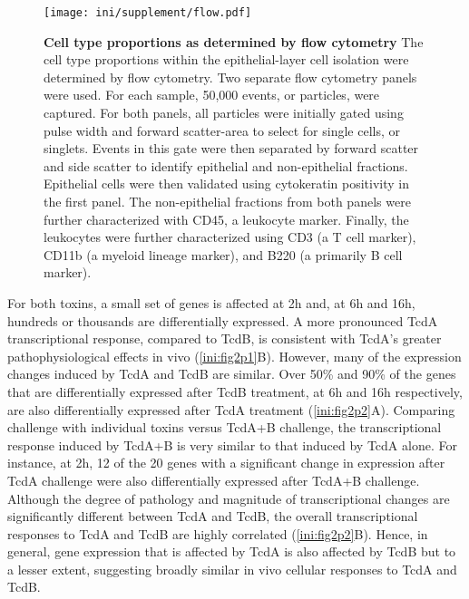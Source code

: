 \begin{figure}[t]
  \centering
    \texttt{[image: ini/supplement/flow.pdf]}
  \caption[Cell type proportions as determined by flow cytometry]
  {\textbf{Cell type proportions as determined by flow cytometry}
  The cell type proportions within the epithelial-layer cell isolation
were determined by flow cytometry. Two
separate flow cytometry panels were used. For each sample, 50,000
events, or particles, were captured. 
For both panels, all particles were initially gated using pulse 
width and forward scatter-area to select for single 
cells, or singlets.  Events in this gate were then separated 
by forward scatter and side scatter to identify epithelial 
and non-epithelial fractions.  Epithelial cells were then 
validated using cytokeratin positivity in the first panel.  
The non-epithelial fractions from both panels were further characterized
with CD45, a leukocyte marker. Finally, the leukocytes were further characterized
using CD3 (a T cell marker), CD11b (a myeloid lineage marker), and 
B220 (a primarily B cell marker).}
  \label{ini:fig:flow}
\end{figure}


For both toxins, a small set of genes is affected at 2h and, at 6h 
and 16h, hundreds or thousands are differentially expressed. A more 
pronounced TcdA transcriptional response, compared to TcdB, is 
consistent with TcdA's greater pathophysiological effects in vivo 
(\autoref{ini:fig2p1}B). However, many of the expression changes 
induced by TcdA and TcdB are similar. Over 50\% and 90\% of the 
genes that are differentially expressed after TcdB treatment, at 
6h and 16h respectively, are also differentially expressed after 
TcdA treatment (\autoref{ini:fig2p2}A). Comparing challenge with 
individual toxins versus TcdA+B challenge, the transcriptional 
response induced by TcdA+B is very similar to that induced by TcdA 
alone. For instance, at 2h, 12 of the 20 genes with a significant 
change in expression after TcdA challenge were also differentially 
expressed after TcdA+B challenge. Although the degree of pathology 
and magnitude of transcriptional changes are significantly 
different between TcdA and TcdB, the overall transcriptional 
responses to TcdA and TcdB are highly correlated (\autoref{ini:fig2p2}B). 
Hence, in general, gene expression that is affected by TcdA is also 
affected by TcdB but to a lesser extent, suggesting broadly similar 
in vivo cellular responses to TcdA and TcdB.

